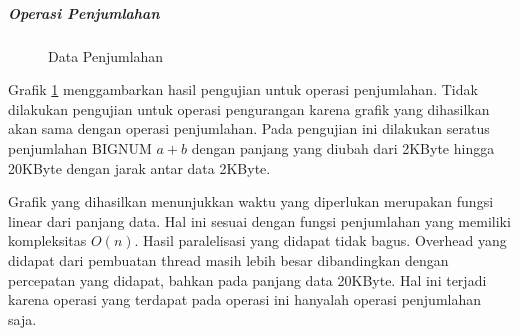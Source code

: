     \subparagraph{Operasi Penjumlahan}
    \begin{figure}[h]
      \centering
      \caption{Data Penjumlahan}
      \label{fig:data_add}
    \end{figure}

    Grafik \ref{fig:data_add} menggambarkan hasil pengujian untuk operasi penjumlahan. Tidak dilakukan pengujian untuk operasi pengurangan karena grafik yang dihasilkan akan sama dengan operasi penjumlahan. Pada pengujian ini dilakukan  seratus penjumlahan BIGNUM $a + b$ dengan panjang yang diubah dari 2KByte hingga 20KByte dengan jarak antar data 2KByte.

    Grafik yang dihasilkan menunjukkan waktu yang diperlukan merupakan fungsi linear dari panjang data. Hal ini sesuai dengan fungsi penjumlahan yang memiliki kompleksitas $O(n)$. Hasil paralelisasi yang didapat tidak bagus. Overhead yang didapat dari pembuatan thread masih lebih besar dibandingkan dengan percepatan yang didapat, bahkan pada panjang data 20KByte. Hal ini terjadi karena operasi yang terdapat pada operasi ini hanyalah operasi penjumlahan saja.

